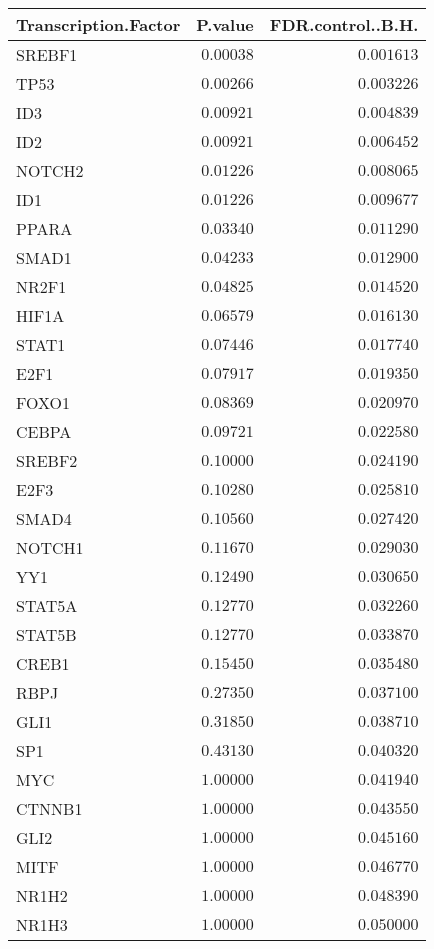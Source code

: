 \begin{table}[!tbp]
\begin{center}
\begin{tabular}{lrr}
\toprule
\multicolumn{1}{c}{Transcription.Factor}&\multicolumn{1}{c}{P.value}&\multicolumn{1}{c}{FDR.control..B.H.}\tabularnewline
\midrule
SREBF1&$0.00038$&$0.001613$\tabularnewline
TP53&$0.00266$&$0.003226$\tabularnewline
ID3&$0.00921$&$0.004839$\tabularnewline
ID2&$0.00921$&$0.006452$\tabularnewline
NOTCH2&$0.01226$&$0.008065$\tabularnewline
ID1&$0.01226$&$0.009677$\tabularnewline
PPARA&$0.03340$&$0.011290$\tabularnewline
SMAD1&$0.04233$&$0.012900$\tabularnewline
NR2F1&$0.04825$&$0.014520$\tabularnewline
HIF1A&$0.06579$&$0.016130$\tabularnewline
STAT1&$0.07446$&$0.017740$\tabularnewline
E2F1&$0.07917$&$0.019350$\tabularnewline
FOXO1&$0.08369$&$0.020970$\tabularnewline
CEBPA&$0.09721$&$0.022580$\tabularnewline
SREBF2&$0.10000$&$0.024190$\tabularnewline
E2F3&$0.10280$&$0.025810$\tabularnewline
SMAD4&$0.10560$&$0.027420$\tabularnewline
NOTCH1&$0.11670$&$0.029030$\tabularnewline
YY1&$0.12490$&$0.030650$\tabularnewline
STAT5A&$0.12770$&$0.032260$\tabularnewline
STAT5B&$0.12770$&$0.033870$\tabularnewline
CREB1&$0.15450$&$0.035480$\tabularnewline
RBPJ&$0.27350$&$0.037100$\tabularnewline
GLI1&$0.31850$&$0.038710$\tabularnewline
SP1&$0.43130$&$0.040320$\tabularnewline
MYC&$1.00000$&$0.041940$\tabularnewline
CTNNB1&$1.00000$&$0.043550$\tabularnewline
GLI2&$1.00000$&$0.045160$\tabularnewline
MITF&$1.00000$&$0.046770$\tabularnewline
NR1H2&$1.00000$&$0.048390$\tabularnewline
NR1H3&$1.00000$&$0.050000$\tabularnewline
\bottomrule
\end{tabular}\end{center}

\end{table}

